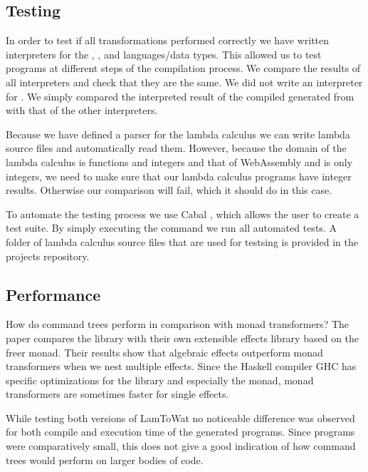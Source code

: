 \subsection{Testing}
In order to test if all transformations performed correctly we have written interpreters for the , , and  languages/data types. This allowed us to test programs at different steps of the compilation process. We compare the results of all interpreters and check that they are the same. We did not write an interpreter for . We simply compared the interpreted result of the compiled  generated from  with that of the other interpreters.

Because we have defined a parser for the lambda calculus we can write lambda source files and automatically read them. However, because the domain of the lambda calculus is functions and integers and that of WebAssembly and  is only integers, we need to make sure that our lambda calculus programs have integer results. Otherwise our comparison will fail, which it should do in this case.

To automate the testing process we use Cabal \autocite{haskellcabal}, which allows the user to create a test suite. By simply executing the  command we run all automated tests. A folder of lambda calculus source files that are used for testsing is provided in the projects repository.

\subsection{Performance}
How do command trees perform in comparison with monad transformers? The paper  \autocite{DBLP:conf/haskell/KiselyovI15} compares the  library with their own extensible effects library based on the freer monad. Their results show that algebraic effects outperform monad transformers when we nest multiple effects. Since the Haskell compiler GHC has specific optimizations for the  library and especially the  monad, monad transformers are sometimes faster for single effects.

While testing both versions of LamToWat no noticeable difference was observed for both compile and execution time of the generated programs. Since programs were comparatively small, this does not give a good indication of how command trees would perform on larger bodies of code.


